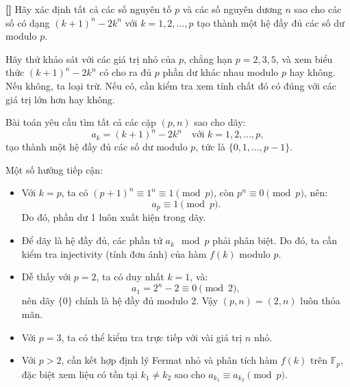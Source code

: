 \documentclass[../05-modular-arithmetic-a.tex]{subfiles}
\begin{document}
\begin{exercise*}\label{example:HUN-2015-TST-KMA-640}\textbf{[]}
    Hãy xác định tất cả các số nguyên tố \( p \) và các số nguyên dương \( n \) sao cho các số có dạng \( (k+1)^n - 2k^n \)
    với \( k = 1, 2, \ldots, p \) tạo thành một hệ đầy đủ các số dư modulo \( p \).
\end{exercise*}

\begin{remark*}
    Hãy thử khảo sát với các giá trị nhỏ của \( p \), chẳng hạn \( p = 2, 3, 5 \), và xem biểu thức \( (k + 1)^n - 2k^n \) có cho ra đủ \( p \) phần dư khác nhau modulo \( p \) hay không.
    Nếu không, ta loại trừ. Nếu có, cần kiểm tra xem tính chất đó có đúng với các giá trị lớn hơn hay không.
\end{remark*}

\begin{story*}
    Bài toán yêu cầu tìm tất cả các cặp \( (p, n) \) sao cho dãy:
    \[
        a_k = (k + 1)^n - 2k^n \quad \text{với } k = 1, 2, \dots, p,
    \]
    tạo thành một hệ đầy đủ các số dư modulo \( p \), tức là \( \{0, 1, \dots, p - 1\} \).

    Một số hướng tiếp cận:
    \begin{itemize}[topsep=0pt, partopsep=0pt, itemsep=0pt]
        \item Với \( k = p \), ta có \( (p + 1)^n \equiv 1^n \equiv 1 \pmod{p} \), còn \( p^n \equiv 0 \pmod{p} \), nên:
        \[
            a_p \equiv 1 \pmod{p}.
        \]
        Do đó, phần dư 1 luôn xuất hiện trong dãy.

        \item Để dãy là hệ đầy đủ, các phần tử \( a_k \mod{p} \) phải phân biệt. Do đó, ta cần kiểm tra injectivity (tính đơn ánh) của hàm \( f(k) \) modulo \( p \).

        \item Dễ thấy với \( p = 2 \), ta có duy nhất \( k = 1 \), và:
        \[
            a_1 = 2^n - 2 \equiv 0 \pmod{2},
        \]
        nên dãy \( \{0\} \) chính là hệ đầy đủ modulo 2. Vậy \( (p,n) = (2,n) \) luôn thỏa mãn.

        \item Với \( p = 3 \), ta có thể kiểm tra trực tiếp với vài giá trị \( n \) nhỏ.

        \item Với \( p > 2 \), cần kết hợp định lý Fermat nhỏ và phân tích hàm \( f(k) \) trên \( \mathbb{F}_p \), đặc biệt xem liệu có tồn tại \( k_1 \ne k_2 \) sao cho \( a_{k_1} \equiv a_{k_2} \pmod{p} \).
    \end{itemize}
\end{story*}
\end{document}

